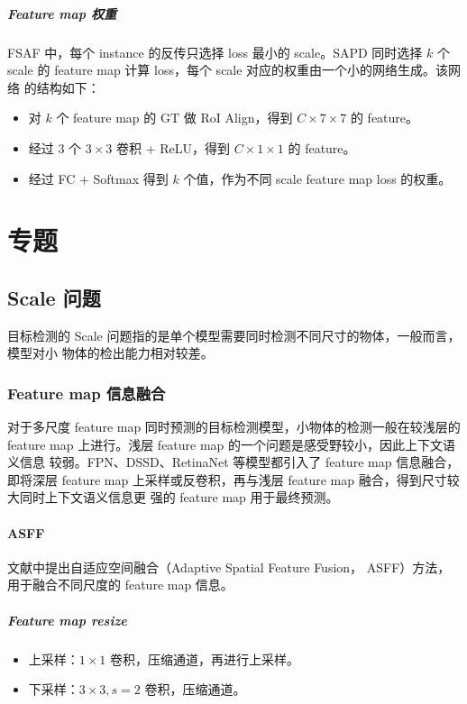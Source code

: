 \paragraph{Feature map 权重}
FSAF 中，每个 instance 的反传只选择 loss 最小的 scale。SAPD 同时选择 $k$ 个
scale 的 feature map 计算 loss，每个 scale 对应的权重由一个小的网络生成。该网络
的结构如下：
\begin{itemize}
  \item 对 $k$ 个 feature map 的 GT 做 RoI Align，得到 $C \times 7 \times 7$ 的 feature。
  \item 经过 3 个 $3 \times 3$ 卷积 + ReLU，得到 $C \times 1 \times 1$ 的 feature。
  \item 经过 FC + Softmax 得到 $k$ 个值，作为不同 scale feature map loss 的权重。
\end{itemize}

\chapter{专题}
\section{Scale 问题}
目标检测的 Scale 问题指的是单个模型需要同时检测不同尺寸的物体，一般而言，模型对小
物体的检出能力相对较差。

\subsection{Feature map 信息融合}
对于多尺度 feature map 同时预测的目标检测模型，小物体的检测一般在较浅层的
feature map 上进行。浅层 feature map 的一个问题是感受野较小，因此上下文语义信息
较弱。FPN、DSSD、RetinaNet 等模型都引入了 feature map 信息融合，即将深层 feature
map 上采样或反卷积，再与浅层 feature map 融合，得到尺寸较大同时上下文语义信息更
强的 feature map 用于最终预测。

\subsubsection{ASFF}
文献中提出自适应空间融合（Adaptive Spatial Feature Fusion，
ASFF）方法，用于融合不同尺度的 feature map 信息。

\paragraph{Feature map resize}
\begin{itemize}
  \item 上采样：$1 \times 1$ 卷积，压缩通道，再进行上采样。
  \item 下采样：$3 \times 3, s = 2$ 卷积，压缩通道。
\end{itemize}

